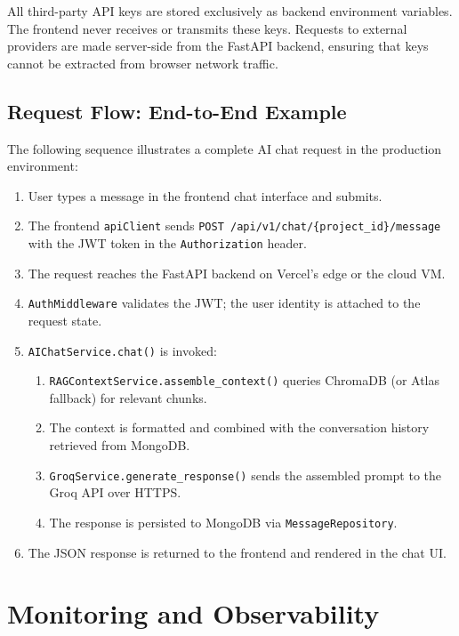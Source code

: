 All third-party API keys are stored exclusively as backend environment variables. The frontend never receives or transmits these keys. Requests to external providers are made server-side from the FastAPI backend, ensuring that keys cannot be extracted from browser network traffic.

\subsection{Request Flow: End-to-End Example}

The following sequence illustrates a complete AI chat request in the production environment:

\begin{enumerate}
    \item User types a message in the frontend chat interface and submits.
    \item The frontend \texttt{apiClient} sends \texttt{POST /api/v1/chat/\{project\_id\}/message} with the JWT token in the \texttt{Authorization} header.
    \item The request reaches the FastAPI backend on Vercel's edge or the cloud VM.
    \item \texttt{AuthMiddleware} validates the JWT; the user identity is attached to the request state.
    \item \texttt{AIChatService.chat()} is invoked:
    \begin{enumerate}
        \item \texttt{RAGContextService.assemble\_context()} queries ChromaDB (or Atlas fallback) for relevant chunks.
        \item The context is formatted and combined with the conversation history retrieved from MongoDB.
        \item \texttt{GroqService.generate\_response()} sends the assembled prompt to the Groq API over HTTPS.
        \item The response is persisted to MongoDB via \texttt{MessageRepository}.
    \end{enumerate}
    \item The JSON response is returned to the frontend and rendered in the chat UI.
\end{enumerate}

\section{Monitoring and Observability}
\label{sec:monitoring}

